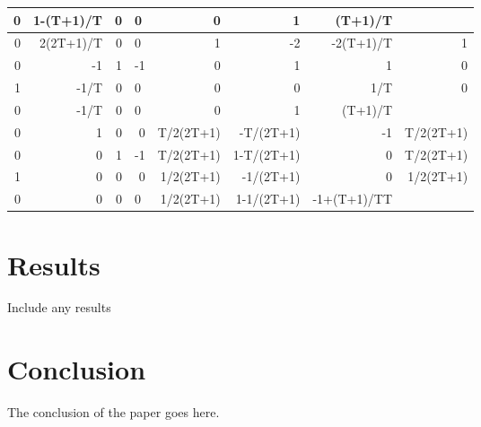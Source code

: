 \begin{table}[ht]
\begin{tabular}{rrrlrrrr}
        0      & 1-(T+1)/T  & 0  & 0                      & 0         & 1          & (T+1)/T     &           \\ \hline
        0      & 2(2T+1)/T  & 0  & 0                      & 1         & -2         & -2(T+1)/T   & 1         \\ \hline
        0      & -1         & 1  & \multicolumn{1}{r}{-1} & 0         & 1          & 1           & 0         \\
        1      & -1/T       & 0  & 0                      & 0         & 0          & 1/T         & 0         \\
        0      & -1/T       & 0  & 0                      & 0         & 1          & (T+1)/T     &           \\ \hline
        0      & 1          & 0  & \multicolumn{1}{r}{0}  & T/2(2T+1) & -T/(2T+1)  & -1          & T/2(2T+1) \\ \hline
        0      & 0          & 1  & \multicolumn{1}{r}{-1} & T/2(2T+1) & 1-T/(2T+1) & 0           & T/2(2T+1) \\
        1      & 0          & 0  & \multicolumn{1}{r}{0}  & 1/2(2T+1) & -1/(2T+1)  & 0           & 1/2(2T+1) \\ \hline
        0      & 0          & 0  & 0                      & 1/2(2T+1) & 1-1/(2T+1) & -1+(T+1)/TT &           \\ \hline
        \end{tabular}
        \end{table}

\section{Results}
Include any results

\section{Conclusion}\label{conclusion2}

The conclusion of the paper goes here.

\autocite{dochtermannMinimalGraphsContractible2023}


\printbibliography[heading=subbibnumbered]
% 
%     

